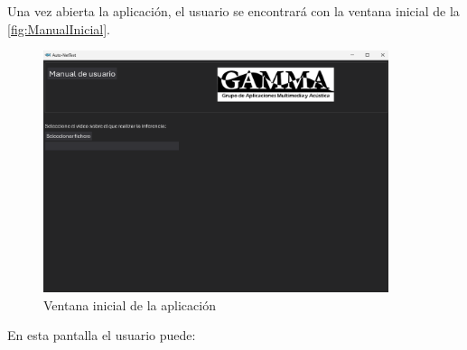 Una vez abierta la aplicación, el usuario se encontrará con la ventana inicial de la \autoref{fig:ManualInicial}.
\begin{figure}[H]
    \centering
    \includegraphics[width=0.9\textwidth]{images/9/Inicial.png}
    \caption{Ventana inicial de la aplicación}
    \label{fig:ManualInicial}
\end{figure}
En esta pantalla el usuario puede:
